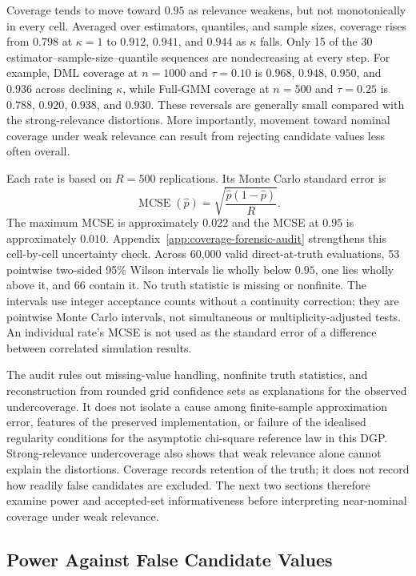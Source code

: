 Coverage tends to move toward $0.95$ as relevance weakens, but not monotonically in every cell. Averaged over estimators, quantiles, and sample sizes, coverage rises from $0.798$ at $\kappa=1$ to $0.912$, $0.941$, and $0.944$ as $\kappa$ falls. Only 15 of the 30 estimator--sample-size--quantile sequences are nondecreasing at every step. For example, DML coverage at $n=1000$ and $\tau=0.10$ is $0.968$, $0.948$, $0.950$, and $0.936$ across declining $\kappa$, while Full-GMM coverage at $n=500$ and $\tau=0.25$ is $0.788$, $0.920$, $0.938$, and $0.930$. These reversals are generally small compared with the strong-relevance distortions. More importantly, movement toward nominal coverage under weak relevance can result from rejecting candidate values less often overall.

Each rate is based on $R=500$ replications. Its Monte Carlo standard error is
\[
\operatorname{MCSE}(\widehat p)
=
\sqrt{\frac{\widehat p(1-\widehat p)}{R}}.
\]
The maximum MCSE is approximately $0.022$ and the MCSE at $0.95$ is approximately $0.010$. Appendix~\ref{app:coverage-forensic-audit} strengthens this cell-by-cell uncertainty check. Across 60,000 valid direct-at-truth evaluations, 53 pointwise two-sided 95\% Wilson intervals lie wholly below $0.95$, one lies wholly above it, and 66 contain it. No truth statistic is missing or nonfinite. The intervals use integer acceptance counts without a continuity correction; they are pointwise Monte Carlo intervals, not simultaneous or multiplicity-adjusted tests. An individual rate's MCSE is not used as the standard error of a difference between correlated simulation results.

The audit rules out missing-value handling, nonfinite truth statistics, and reconstruction from rounded grid confidence sets as explanations for the observed undercoverage. It does not isolate a cause among finite-sample approximation error, features of the preserved implementation, or failure of the idealised regularity conditions for the asymptotic chi-square reference law in this DGP. Strong-relevance undercoverage also shows that weak relevance alone cannot explain the distortions. Coverage records retention of the truth; it does not record how readily false candidates are excluded. The next two sections therefore examine power and accepted-set informativeness before interpreting near-nominal coverage under weak relevance.

\subsection{Power Against False Candidate Values}
\label{sec:results-power}

